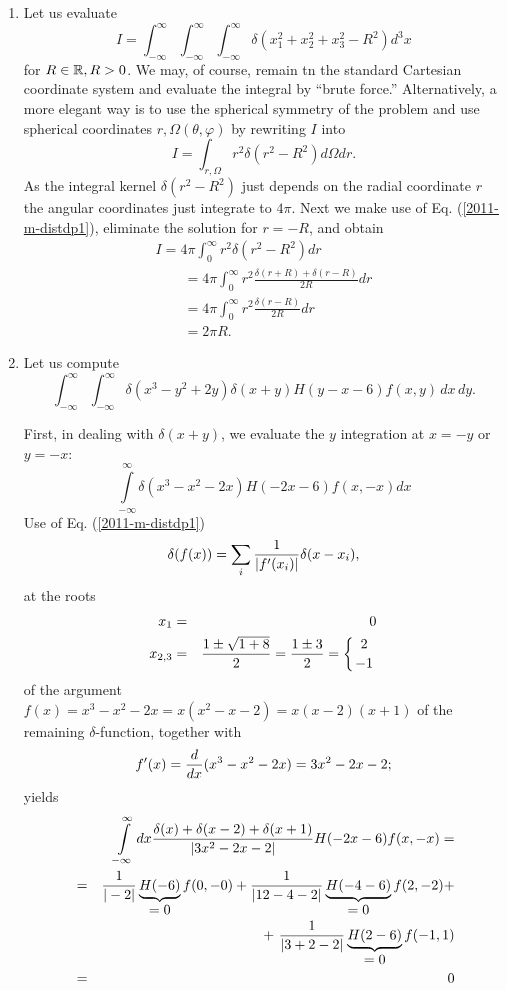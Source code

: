 {\begin{enumerate}
\item
Let us evaluate
\begin{equation}
I=
\int_{-\infty}^\infty
\int_{-\infty}^\infty
\int_{-\infty}^\infty
\delta (x_1^2+x_2^2+x_3^2-R^2) d^3x
\end{equation}
for  $R \in {\Bbb R}, R >0 $.
We may, of course, remain tn the standard Cartesian coordinate system and evaluate the integral by ``brute force.''
Alternatively,
a more elegant way is to use the spherical symmetry of the problem and use spherical coordinates $r, \Omega (\theta ,\varphi )$ by rewriting $I$
into
\begin{equation}
I=  \int_{r,\Omega} r^2  \delta (r^2-R^2) d\Omega dr.
\end{equation}
As the integral kernel $\delta (r^2-R^2)$ just depends on the radial coordinate $r$
the angular coordinates just integrate to $4\pi$.
Next we make use of Eq. (\ref{2011-m-distdp1}), eliminate the solution for $r=-R$, and obtain
\begin{equation}
\begin{split}
I= 4\pi   \int_0^\infty r^2  \delta (r^2-R^2)  dr \\
\qquad =  4\pi   \int_0^\infty  r^2 \frac{\delta (r+R) + \delta (r-R)}{2R}  dr \\
\qquad =   4\pi   \int_0^\infty  r^2 \frac{\delta (r-R)}{2R}  dr \\
\qquad =   2 \pi R.
\end{split}
\end{equation}

\item
Let us compute
\begin{equation}
\int_{-\infty}^\infty \int_{-\infty}^\infty  \delta
 (x^3-y^2+2y)\delta (x+y)H (y-x-6)f(x,y) \,dx\,dy.
\end{equation}

First, in dealing with
$\delta(x+y)$, we evaluate the $y$ integration at $x=-y$ or $y=-x$:
$$
   \int\limits_{-\infty}^\infty \delta(x^3-x^2-2x)H(-2x-6)f(x,-x)  dx
$$
Use of Eq. (\ref{2011-m-distdp1})
$$
   \delta(f(x))=\sum_{i}{1\over|f'(x_i)|}\delta(x-x_i),
$$
at the roots
\begin{eqnarray*}
   x_1&=&0\\
   x_{2,3}&=&{1\pm\sqrt{1+8}\over 2}={1\pm3\over2}=\left\{{2\atop-1}\right.
\end{eqnarray*}
of the argument $f(x)=x^3-x^2-2x=x(x^2-x-2)=x(x-2)(x+1)$ of the remaining $\delta$-function,
together with
$$
 f'(x)=  {d\over dx}(x^3-x^2-2x)=3x^2-2x-2 ;
$$
yields
\begin{eqnarray*}
   &&\int\limits_{-\infty}^\infty dx
         {\delta(x)+\delta(x-2)+\delta(x+1)\over|3x^2-2x-2|}
         H(-2x-6)f(x,-x)=\\
   &=&{1\over|-2|}\underbrace{H(-6)}_{\mbox{$=0$}}f(0,-0)+
      {1\over|12-4-2|}\underbrace{H(-4-6)}_{\mbox{$=0$}}f(2,-2)+\\
   & &+\ {1\over|3+2-2|}\underbrace{H(2-6)}_{\mbox{$=0$}}f(-1,1)\\
&=&0
\end{eqnarray*}



\end{enumerate}}
